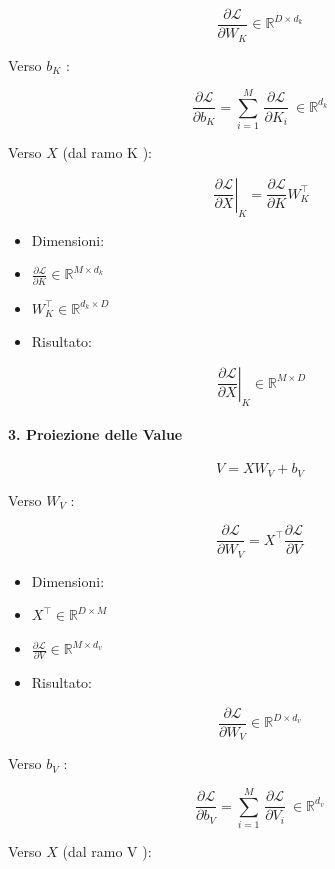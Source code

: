 \documentclass[
  11pt,
]{article}
\begin{document}
\[\frac{\partial\mathcal{L}}{\partial W_{K}} \in \mathbb{R}^{D \times d_{k}}\]

Verso \(b_{K}\) :

\[\frac{\partial\mathcal{L}}{\partial b_{K}} = \sum_{i = 1}^{M}\,\frac{\partial\mathcal{L}}{\partial K_{i}}\  \in \mathbb{R}^{d_{k}}\]

Verso \(X\) (dal ramo K ):

\[\left. \ \frac{\partial\mathcal{L}}{\partial X} \right|_{K} = \frac{\partial\mathcal{L}}{\partial K}W_{K}^{\top}\]

\begin{itemize}
\item
  Dimensioni:
\item
  \(\frac{\partial\mathcal{L}}{\partial K} \in \mathbb{R}^{M \times d_{k}}\)
\item
  \(W_{K}^{\top} \in \mathbb{R}^{d_{k} \times D}\)
\item
  Risultato:
\end{itemize}

\[\left. \ \frac{\partial\mathcal{L}}{\partial X} \right|_{K} \in \mathbb{R}^{M \times D}\]

\paragraph{3. Proiezione delle Value}

\[V = XW_{V} + b_{V}\]

Verso \(W_{V}\) :

\[\frac{\partial\mathcal{L}}{\partial W_{V}} = X^{\top}\frac{\partial\mathcal{L}}{\partial V}\]

\begin{itemize}
\item
  Dimensioni:
\item
  \(X^{\top} \in \mathbb{R}^{D \times M}\)
\item
  \(\frac{\partial\mathcal{L}}{\partial V} \in \mathbb{R}^{M \times d_{v}}\)
\item
  Risultato:
\end{itemize}

\[\frac{\partial\mathcal{L}}{\partial W_{V}} \in \mathbb{R}^{D \times d_{v}}\]

Verso \(b_{V}\) :

\[\frac{\partial\mathcal{L}}{\partial b_{V}} = \sum_{i = 1}^{M}\,\frac{\partial\mathcal{L}}{\partial V_{i}}\  \in \mathbb{R}^{d_{v}}\]

Verso \(X\) (dal ramo V ):
\end{document}
